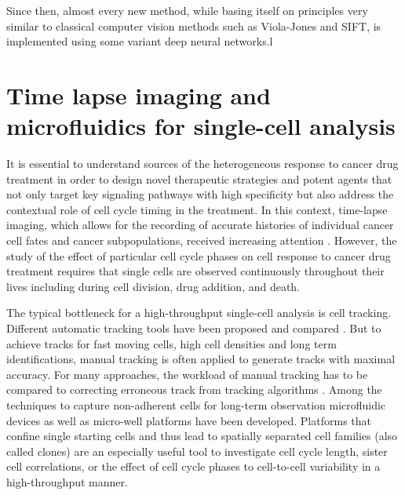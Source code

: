 \documentclass[pdftex,12pt,a4paper]{report}
\begin{document}
Since then, almost every new method, while basing itself on principles very similar to classical computer vision methods such as Viola-Jones and SIFT, is implemented using some variant deep neural networks.l


\section{Time lapse imaging and microfluidics for single-cell analysis}

It is essential to understand sources of the heterogeneous response to cancer drug treatment in order to design novel therapeutic strategies and potent agents that not only target key signaling pathways with high specificity but also address the contextual role of cell cycle timing in the treatment. In this context, time-lapse imaging, which allows for the recording of accurate histories of individual cancer cell fates and cancer subpopulations, received increasing attention \cite{gascoigne2008cancer, hawkins2009single, aftab2014label}. However, the study of the effect of particular cell cycle phases on cell response to cancer drug treatment requires that single cells are observed continuously throughout their lives including during cell division, drug addition, and death.

The typical bottleneck for a high-throughput single-cell analysis is cell tracking. Different automatic tracking tools have been proposed \cite{doh2010cell, zurgil2010polymer} and compared \cite{chenouard2014objective, skylaki2016challenges, wlodkowic2009microfluidic}. But to achieve tracks for fast moving cells, high cell densities and long term identifications, manual tracking is often applied \cite{hilsenbeck2016software, rettig2005large, zurgil2010polymer} to generate tracks with maximal accuracy. For many approaches, the workload of manual tracking has to be compared to correcting erroneous track from tracking algorithms \cite{skylaki2016challenges}. Among the techniques to capture non-adherent cells for long-term observation microfluidic devices \cite{wlodkowic2009microfluidic} as well as micro-well platforms \cite{rettig2005large, doh2010cell, zurgil2010polymer, zaretsky2012monitoring, day2009method, schiffenbauer2009cell} have been developed. Platforms that confine single starting cells and thus lead to spatially separated cell families (also called clones) are an especially useful tool to investigate cell cycle length, sister cell correlations, or the effect of cell cycle phases to cell-to-cell variability in a high-throughput manner.
\end{document}
